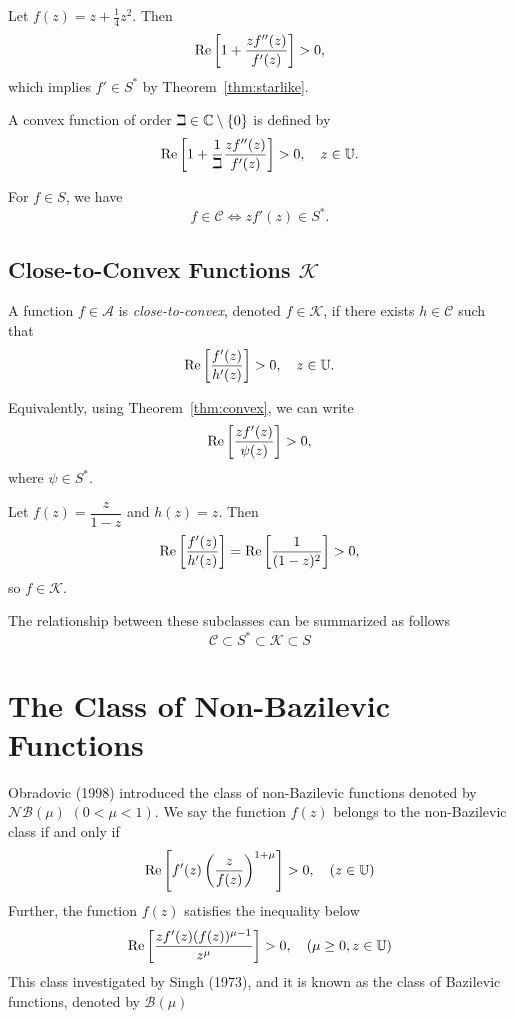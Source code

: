 \begin{example}
	Let \(f(z) = z + \frac{1}{4} z^2\). Then
	\[
	\operatorname{Re}\left[ 1 + \frac{z f''(z)}{f'(z)} \right] > 0,
	\]
	which implies \(f' \in S^*\) by Theorem~\ref{thm:starlike}.
\end{example}

\begin{definition}
	A convex function of order \(\beth \in \mathbb{C} \setminus \{0\}\) is defined by
	\[
	\operatorname{Re}\left[ 1 + \frac{1}{\beth} \frac{z f''(z)}{f'(z)} \right] > 0, \quad z \in \mathbb{U}.
	\]
\end{definition}

\begin{theorem}
	For \(f \in S\), we have
	\[
	f \in \mathcal{C} \iff z f'(z) \in S^*.
	\]
\end{theorem}

\subsection{Close-to-Convex Functions \(\mathcal{K}\)}

\begin{definition}[{[2]}]
	A function \(f \in \mathcal{A}\) is \emph{close-to-convex}, denoted \(f \in \mathcal{K}\), if there exists \(h \in \mathcal{C}\) such that
	\[
	\operatorname{Re}\left[ \frac{f'(z)}{h'(z)} \right] > 0, \quad z \in \mathbb{U}.
	\]
	
	Equivalently, using Theorem~\ref{thm:convex}, we can write
	\[
	\operatorname{Re}\left[ \frac{z f'(z)}{\psi(z)} \right] > 0,
	\]
	where \(\psi \in S^*\).
\end{definition}

\begin{example}
	Let \(f(z) = \dfrac{z}{1-z}\) and \(h(z) = z\). Then
	\[
	\operatorname{Re}\left[ \frac{f'(z)}{h'(z)} \right] = \operatorname{Re}\left[ \frac{1}{(1-z)^2} \right] > 0,
	\]
	so \(f \in \mathcal{K}\).
\end{example}

The relationship between these subclasses can be summarized as follows
\[
\mathcal{C} \subset S^* \subset \mathcal{K} \subset S
\]

\section{The Class of Non-Bazilevic Functions}
Obradovic (1998) introduced the class of non-Bazilevic functions denoted by $\mathcal{NB}(\mu)$ $(0<\mu<1)$. We say the function $f(z)$ belongs to the non-Bazilevic class if and only if
\[
\operatorname{Re}\left[f'(z)\left(\frac{z}{f(z)}\right)^{1+\mu}\right] > 0,\quad (z\in\mathbb{U})
\]
Further, the function $f(z)$ satisfies the inequality below
\[
\operatorname{Re}\left[\frac{zf'(z) (f(z))^{\mu-1}}{z^\mu}\right] > 0,\quad (\mu\ge 0, z\in\mathbb{U})
\]
This class investigated by Singh (1973), and it is known as the class of Bazilevic functions, denoted by $\mathcal{B}(\mu)$

